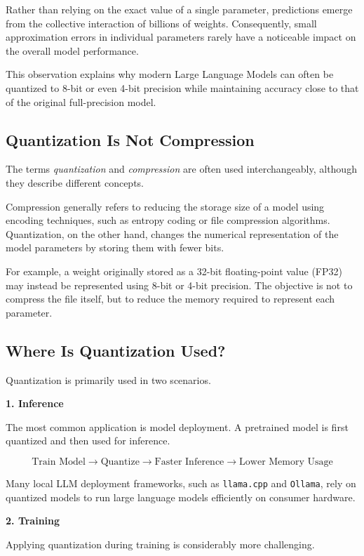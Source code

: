 Rather than relying on the exact value of a single parameter, predictions emerge from the collective interaction of billions of weights. Consequently, small approximation errors in individual parameters rarely have a noticeable impact on the overall model performance.

This observation explains why modern Large Language Models can often be quantized to 8-bit or even 4-bit precision while maintaining accuracy close to that of the original full-precision model.
\subsection*{Quantization Is Not Compression}

The terms \emph{quantization} and \emph{compression} are often used interchangeably, although they describe different concepts.

Compression generally refers to reducing the storage size of a model using encoding techniques, such as entropy coding or file compression algorithms. Quantization, on the other hand, changes the numerical representation of the model parameters by storing them with fewer bits.

For example, a weight originally stored as a 32-bit floating-point value (FP32) may instead be represented using 8-bit or 4-bit precision. The objective is not to compress the file itself, but to reduce the memory required to represent each parameter.
\subsection*{Where Is Quantization Used?}

Quantization is primarily used in two scenarios.

\textbf{1. Inference}

The most common application is model deployment. A pretrained model is first quantized and then used for inference.

\[
\text{Train Model}
\longrightarrow
\text{Quantize}
\longrightarrow
\text{Faster Inference}
\longrightarrow
\text{Lower Memory Usage}
\]

Many local LLM deployment frameworks, such as \texttt{llama.cpp} and \texttt{Ollama}, rely on quantized models to run large language models efficiently on consumer hardware.

\vspace{0.4cm}

\textbf{2. Training}

Applying quantization during training is considerably more challenging.


